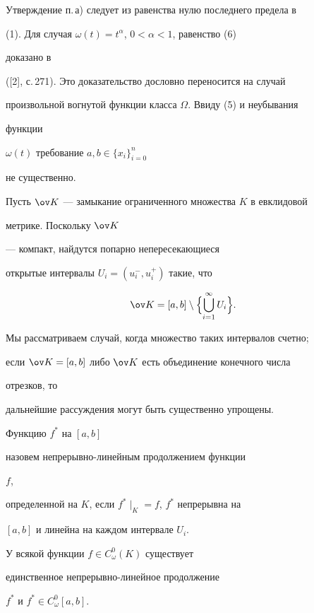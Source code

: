 Утверждение п.\,а) следует из равенства нулю последнего предела в


(1). Для случая $\omega(t)=t^\alpha$, $0<\alpha<1$, равенство (6)


доказано в


([2], с.\,271). Это доказательство дословно переносится на случай


произвольной вогнутой функции класса $\Omega$. Ввиду (5) и неубывания


функции


$\omega(t)$ требование $a,b\in\{x_i\}^n_{i=0}$


не существенно.





Пусть $\ov K$ --- замыкание ограниченного множества $K$ в евклидовой


метрике. Поскольку $\ov K$


--- компакт, найдутся попарно непересекающиеся


открытые интервалы $U_i=(u^-_i,u^+_i)$ такие, что


$$


\ov K=[a,b]\setminus \Bigl\{\bigcup^\infty_{i=1}U_i\Bigr\}.


$$


Мы рассматриваем случай, когда множество таких интервалов счетно;


если $\ov K=[a,b]$ либо $\ov K$ есть объединение конечного числа


отрезков, то


дальнейшие рассуждения могут быть существенно упрощены.





Функцию $f^*$ на $[a,b]$


назовем непрерывно-линейным продолжением функции


$f$,


определенной на $K$, если $f^*\mid_K=f$, $f^*$ непрерывна на


$[a,b]$ и линейна на каждом интервале $U_i$.





\begin{lem} У всякой функции $f\in C^0_\omega(K)$ существует


единственное непрерывно-линейное продолжение


$f^*$ и $f^*\in C^0_\omega[a,b]$.


\end{lem}





